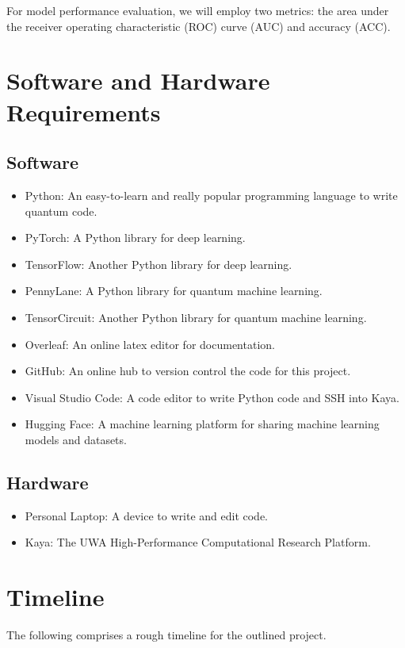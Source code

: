 For model performance evaluation, we will employ two metrics: the
area under the receiver operating characteristic (ROC) curve (AUC)
and accuracy (ACC).

\section{Software and Hardware Requirements}
\label{sec:requirements}

\subsection{Software}
\label{subsec:software}
\begin{itemize}
    \setlength{
  \itemsep}{-1ex}
  \item Python: An easy-to-learn and really popular programming
    language to write quantum code.
  \item PyTorch: A Python library for deep learning.
  \item TensorFlow: Another Python library for deep learning.
  \item PennyLane: A Python library for quantum machine learning.
  \item TensorCircuit: Another Python library for quantum machine learning.
  \item Overleaf: An online latex editor for documentation.
  \item GitHub: An online hub to version control the code for this project.
  \item Visual Studio Code: A code editor to write Python code and
    SSH into Kaya.
  \item Hugging Face: A machine learning platform for sharing machine
    learning models and datasets.
\end{itemize}

\subsection{Hardware}
\label{subsec:hardware}

\begin{itemize}
    \setlength{
  \itemsep}{-1ex}
  \item Personal Laptop: A device to write and edit code.
  \item Kaya: The UWA High-Performance Computational Research Platform.
\end{itemize}

\section{Timeline}
\label{sec:timeline}
The following comprises a rough timeline for the outlined project.


